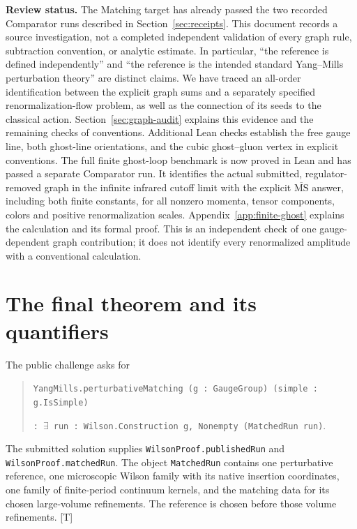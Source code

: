 \documentclass[11pt]{article}
\makeatletter
\newcommand{\MS}{\overline{\mathrm{MS}}}
\newcommand{\code}[1]{{\small\nolinkurl{#1}}}
\newcommand{\src}[1]{\textsf{[#1]}}
\newcommand{\compactcontents}{\begingroup\small\setlength{\parskip}{0pt}
\renewcommand{\l@section}{\@dottedtocline{1}{0em}{1.8em}}
\tableofcontents\endgroup}
\makeatother
\begin{document}
\textbf{Review status.} The Matching target has already passed the two
recorded Comparator runs described in Section~\ref{sec:receipts}. This
document records a source investigation, not a completed independent
validation of every graph rule, subtraction convention, or analytic
estimate. In particular, ``the reference is defined independently'' and
``the reference is the intended standard Yang--Mills perturbation theory''
are distinct claims. We have traced an all-order identification between
the explicit graph sums and a separately specified renormalization-flow
problem, as well as the connection of its seeds to the classical action.
Section~\ref{sec:graph-audit} explains this evidence and the remaining
checks of conventions. Additional Lean checks establish the free gauge
line, both ghost-line orientations, and the cubic ghost--gluon vertex
in explicit conventions. The full finite ghost-loop benchmark is now
proved in Lean and has passed a separate Comparator run. It identifies
the actual submitted, regulator-removed graph in the infinite infrared
cutoff limit with the explicit $\MS$ answer, including both finite
constants, for all nonzero momenta, tensor components, colors and positive
renormalization scales. Appendix~\ref{app:finite-ghost} explains the
calculation and its formal proof. This is an independent check of one
gauge-dependent graph contribution; it does not identify every
renormalized amplitude with a conventional calculation.

\setcounter{tocdepth}{1}
\compactcontents
\clearpage

\section{The final theorem and its quantifiers}
\label{sec:statement}

The public challenge asks for
\begin{quote}
\code{YangMills.perturbativeMatching (g : GaugeGroup) (simple : g.IsSimple)}\par
\code{:}\ $\exists$\ \code{run : Wilson.Construction g, Nonempty (MatchedRun run)}.
\end{quote}
The submitted solution supplies \code{WilsonProof.publishedRun} and
\code{WilsonProof.matchedRun}. The object \code{MatchedRun} contains one
perturbative reference, one microscopic Wilson family with its native
insertion coordinates, one family of finite-period continuum kernels,
and the matching data for its chosen large-volume refinements. The
reference is chosen before those volume refinements. \src{T}
\end{document}
